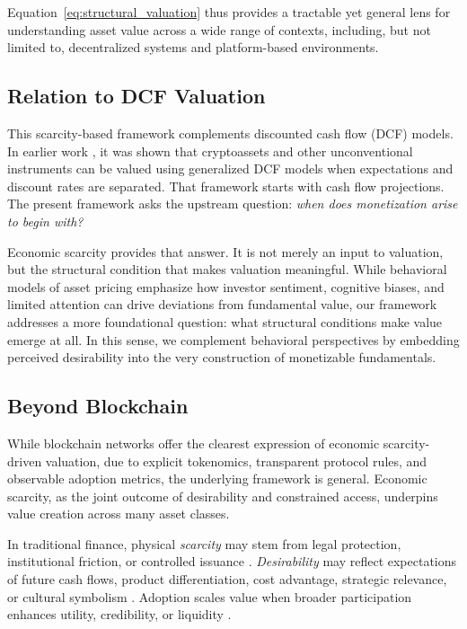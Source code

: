 \documentclass[12pt]{article}
\begin{document}
Equation~\eqref{eq:structural_valuation} thus provides a tractable yet general lens for understanding asset value across a wide range of contexts, including, but not limited to, decentralized systems and platform-based environments.




\subsection{Relation to DCF Valuation}

This scarcity-based framework complements discounted cash flow (DCF) models. In earlier work \citep{papadogiannis2025dualrisk}, it was shown that cryptoassets and other unconventional instruments can be valued using generalized DCF models when expectations and discount rates are separated. That framework starts with cash flow projections. The present framework asks the upstream question: \textit{when does monetization arise to begin with?}

Economic scarcity provides that answer. It is not merely an input to valuation, but the structural condition that makes valuation meaningful. While behavioral models of asset pricing \citep{barberis1998investor, daniel1998investor, hong2000bad, benartzi1995myopic, thaler1997effect, papadogiannis2025dualrisk} emphasize how investor sentiment, cognitive biases, and limited attention can drive deviations from fundamental value, our framework addresses a more foundational question: what structural conditions make value emerge at all. In this sense, we complement behavioral perspectives by embedding perceived desirability into the very construction of monetizable fundamentals.


\subsection{Beyond Blockchain}

While blockchain networks offer the clearest expression of economic scarcity-driven valuation, due to explicit tokenomics, transparent protocol rules, and observable adoption metrics, the underlying framework is general. Economic scarcity, as the joint outcome of desirability and constrained access, underpins value creation across many asset classes.

In traditional finance, physical \textit{scarcity} may stem from legal protection, institutional friction, or controlled issuance \citep{merton1987simple, pagano1998choice}. \textit{Desirability} may reflect expectations of future cash flows, product differentiation, cost advantage, strategic relevance, or cultural symbolism \citep{barberis1998investor, porter1985competitive, lu2025unveiling}. Adoption scales value when broader participation enhances utility, credibility, or liquidity \citep{rochet2003platform, easley2019from}.
\end{document}
